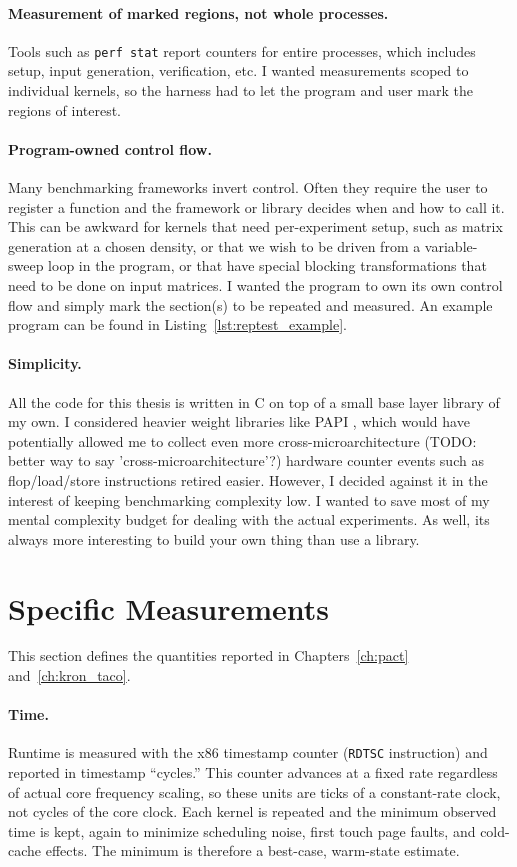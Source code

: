 \paragraph{Measurement of marked regions, not whole processes.}
Tools such as \texttt{perf stat} report counters for entire processes, which includes setup, input generation, verification, etc. I wanted
measurements scoped to individual kernels, so the harness had to let the program and user mark the regions of interest.

\paragraph{Program-owned control flow.}
Many benchmarking frameworks invert control. Often they require the user to register a
function and the framework or library decides when and how to call it. This can be
awkward for kernels that need per-experiment setup, such as matrix
generation at a chosen density, or that we wish to be driven from a variable-sweep loop in
the program, or that have special blocking transformations that need to be done on input matrices.
I wanted the program to own its own control flow and simply mark the section(s) to be repeated and measured.
An example program can be found in Listing~\ref{lst:reptest_example}.

\paragraph{Simplicity.}
All the code for this thesis is written in C on top of a small base layer library of my own.
I considered heavier weight libraries like PAPI \cite{papi}, which would have potentially
allowed me to collect even more cross-microarchitecture (TODO: better way to say 'cross-microarchitecture'?) hardware counter events such as
flop/load/store instructions retired easier. However, I decided against it in the interest of keeping
benchmarking complexity low. I wanted to save most of my mental complexity budget for dealing with the actual experiments. As well, its always
more interesting to build your own thing than use a library.

\section{Specific Measurements}
This section defines the quantities reported in Chapters~\ref{ch:pact} and~\ref{ch:kron_taco}.

\paragraph{Time.}
Runtime is measured with the x86 timestamp counter (\texttt{RDTSC} instruction) and
reported in timestamp ``cycles.'' This counter advances at a fixed rate regardless of actual core frequency
scaling, so these units are ticks of a constant-rate clock, not cycles
of the core clock. Each kernel is repeated and the minimum observed time is kept, again to minimize scheduling noise, first touch page faults,
and cold-cache effects. The minimum is therefore a best-case, warm-state estimate.

